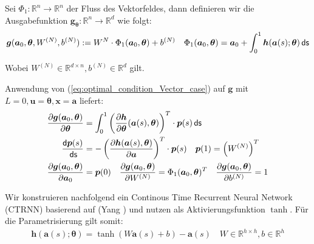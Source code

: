 \documentclass[a4paper, 12pt]{scrartcl}
\newcommand{\ds}{\thinspace \mathsf{ds}}
\begin{document}
Sei $\Phi_1:\mathbb{R}^n \to \mathbb{R}^n$ der Fluss des Vektorfeldes, dann 
definieren wir die Ausgabefunktion $\bm{g}_{\bm{\theta}}:\mathbb{R}^n \to \mathbb{R}^d$
wie folgt:
%
\begin{align*}
    \bm{g}(\bm{a}_0, \bm{\theta},W^{(N)}, b^{(N)})
    :=
    W^{N}
    \cdot 
    \Phi_1(\bm{a}_0, \bm{\theta})
    + 
    b^{(N)}
    \quad
    \Phi_1(\bm{a}_0, \bm{\theta})
    =
    \bm{a}_0 + \int_{0}^{1} \bm{h}(\bm{a}(s); \bm{\theta}) \ds
\end{align*}

Wobei $W^{(N)} \in \mathbb{R}^{d \times n}, b^{(N)}  \in \mathbb{R}^{d}$ gilt.

\begin{bem}
    Anwendung von (\ref{eq:optimal_condition_Vector_case}) 
    auf $\bm{g}$ mit $L = 0, \bm{u}=\bm{\theta}, \bm{x}=\bm{a}$ liefert:
    \begin{align*}
        \frac{\partial \bm{g}(\bm{a}_0, \bm{\theta})}{\partial \bm{\theta}} 
        &=
        \int_{0}^{1} 
        \left(
            \frac{
                \partial \bm{h}
                }{
                    \partial \bm{\theta}
            } (\bm{a}(s),\bm{\theta})
        \right)^T
        \cdot 
        \bm{p}(s) \ds 
        \\
        \frac{\mathsf{d} \bm{p}(s)}{\ds}
        &=
        -
        \left(
            \frac{\partial \bm{h}(\bm{a}(s),\bm{\theta})}{\partial \bm{a}}
        \right)^T
        \cdot \bm{p}(s)
        \quad
        \bm{p}(1) =
        \left(W^{(N)}\right)^T
        \\
        \frac{\partial \bm{g}(\bm{a}_0, \bm{\theta})}{\partial \bm{a}_0}
        &=
        \bm{p}(0)
        \quad
        \frac{\partial \bm{g}(\bm{a}_0, \bm{\theta})}{\partial W^{(N)}}
        =
        \Phi_1(\bm{a}_0, \bm{\theta})^T
        \quad
        \frac{\partial \bm{g}(\bm{a}_0, \bm{\theta})}{\partial b^{(N)}}
        =
        1
    \end{align*}
\end{bem}


Wir konstruieren nachfolgend ein Continous Time Recurrent Neural Network (CTRNN) 
basierend auf (Yang \cite{CTRNN_Yang2022}) und nutzen 
als Aktivierungsfunktion $\tanh$.
Für die Parametrisierung gilt somit:
%
\begin{align}
    \bm{h}(\bm{a}(s); \bm{\theta})
    =
    \tanh
    \left(
        W \bm{a}(s) + b
    \right)
    - \bm{a}(s)
    \quad
    W \in \mathbb{R}^{h \times h}, b  \in \mathbb{R}^{h}
    \label{eq:CTRNN}
\end{align}
\end{document}
